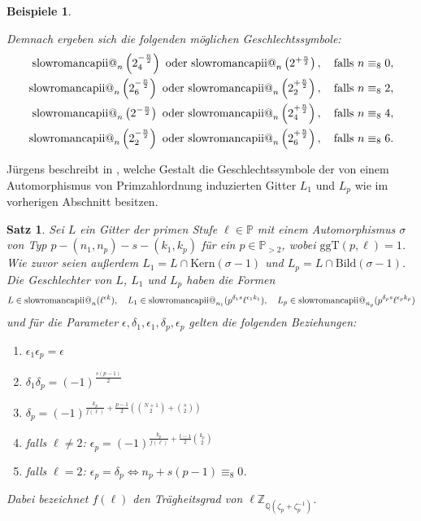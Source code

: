 \documentclass[12pt,a4paper,halfparskip,headsepline,bibtotocnumbered]{scrreprt}
\makeatletter
\theoremstyle{nummermitklammern}
\newtheorem{satz}[defsatzusw]{Satz}
\newtheorem{beispiele}[defsatzusw]{Beispiele}
\theoremstyle{nonumberbreak}
\newcommand{\Z}{\mathbb{Z}}
\newcommand{\Q}{\mathbb{Q}}
\renewcommand{\P}{\mathbb{P}}
\newcommand{\ii}{\text{\expandafter\@slowromancap\romannumeral 2@}}
\newcommand{\Kern}{\text{Kern}}
\newcommand{\Bild}{\text{Bild}}
\newcommand{\ggT}{\text{ggT}}
\makeatother
\begin{document}
\begin{beispiele}
\begin{enumerate}[label=(\roman*)]
			Demnach ergeben sich die folgenden möglichen Geschlechtssymbole:
			\begin{align*}
				\ii_n \left( 2_4^{-\frac{n}{2}} \right) \text{ oder } \ii_n \left( 2^{+\frac{n}{2}} \right), \quad \text{falls } n \equiv_8 0,\\
				\ii_n \left( 2_6^{-\frac{n}{2}} \right) \text{ oder } \ii_n \left( 2_2^{+\frac{n}{2}} \right), \quad \text{falls } n \equiv_8 2,\\
				\ii_n \left( 2^{-\frac{n}{2}} \right) \text{ oder } \ii_n \left( 2_4^{+\frac{n}{2}} \right), \quad \text{falls } n \equiv_8 4,\\
				\ii_n \left( 2_2^{-\frac{n}{2}} \right) \text{ oder } \ii_n \left( 2_6^{+\frac{n}{2}} \right), \quad \text{falls } n \equiv_8 6.
			\end{align*}
	\end{enumerate}
\end{beispiele}

Jürgens beschreibt in \cite[Abschnitt (4.1.3)]{juergens}, welche Gestalt die Geschlechtssymbole der von einem Automorphismus von Primzahlordnung induzierten Gitter $L_1$ und $L_p$ wie im vorherigen Abschnitt besitzen.

\begin{framed}
	\begin{satz}
		Sei $L$ ein Gitter der primen Stufe $\ell \in \P$ mit einem Automorphismus $\sigma$ von Typ $p - (n_1, n_p) - s - (k_1, k_p)$ für ein $p \in \P_{> 2}$, wobei $\ggT(p, \ell) = 1$. Wie zuvor seien außerdem $L_1 = L \cap \Kern(\sigma-1)$ und $L_p = L \cap \Bild(\sigma-1)$. Die Geschlechter von $L$, $L_1$ und $L_p$ haben die Formen
		\begin{equation*}
			L \in \ii_n(\ell^{\epsilon k}), \quad L_1 \in \ii_{n_1}(p^{\delta_1 s} \ell^{\epsilon_1 k_1}), \quad L_p \in \ii_{n_p}(p^{\delta_p s} \ell^{\epsilon_p k_p})
		\end{equation*}	
		und für die Parameter $\epsilon, \delta_1, \epsilon_1, \delta_p, \epsilon_p$ gelten die folgenden Beziehungen:
		\begin{enumerate}[label=(\roman*)]
			\item $\epsilon_1 \epsilon_p = \epsilon$
			\item $\delta_1 \delta_p = (-1)^{\frac{s(p-1)}{2}}$
			\item $\delta_p = (-1)^{\frac{k_p}{f(\ell)} + \frac{p-1}{2}\left({N+1 \choose 2} + {s \choose 2}\right)}$
			\item falls $\ell \neq 2$: $\epsilon_p = (-1)^{\frac{k_p}{f(\ell)} + \frac{l-1}{2} {k_p \choose 2}}$
			\item falls $\ell = 2$: $\epsilon_p = \delta_p \Leftrightarrow n_p + s(p-1) \equiv_8 0$.
		\end{enumerate}
		Dabei bezeichnet $f(\ell)$ den Trägheitsgrad von $\ell \Z_{\Q(\zeta_p + \zeta_p^{-1})}$.
	\end{satz}
\end{framed}
\end{document}

